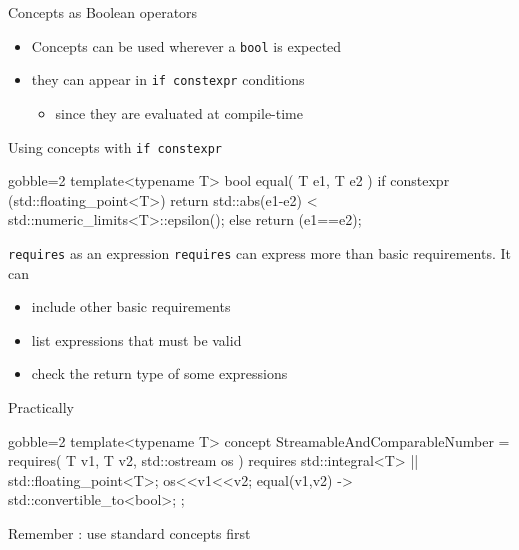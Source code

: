 \begin{frame}[fragile]
    \begin{block}{Concepts as Boolean operators}
      \begin{itemize}
        \item Concepts can be used wherever a \texttt{bool} is expected
        \item they can appear in \texttt{if constexpr} conditions
          \begin{itemize}
          \item since they are evaluated at compile-time
          \end{itemize}
      \end{itemize}
    \end{block}
    \begin{exampleblock}{Using concepts with \texttt{if constexpr}}
      \small
      \begin{cppcode*}{gobble=2}
      template<typename T>
      bool equal( T e1, T e2 )
      {
        if constexpr (std::floating_point<T>) {
          return std::abs(e1-e2)
                   < std::numeric_limits<T>::epsilon();
        } else {
          return (e1==e2);
        }
      }
      \end{cppcode*}
    \end{exampleblock}
\end{frame}

\begin{frame}[fragile]
    \begin{block}{\texttt{requires} as an expression}
        \texttt{requires} can express more than basic requirements. It can
        \begin{itemize}
            \item include other basic requirements
            \item list expressions that must be valid
            \item check the return type of some expressions
        \end{itemize}
    \end{block}
    \begin{exampleblock}{Practically}
      \small
      \begin{cppcode*}{gobble=2}
      template<typename T>
      concept StreamableAndComparableNumber =
      requires( T v1, T v2, std::ostream os ) {
        requires std::integral<T> || std::floating_point<T>;
        os<<v1<<v2;
        { equal(v1,v2) } -> std::convertible_to<bool>;
      };
      \end{cppcode*}
    \end{exampleblock}
    \begin{block}{}
      Remember : use standard concepts first
    \end{block}
\end{frame}

